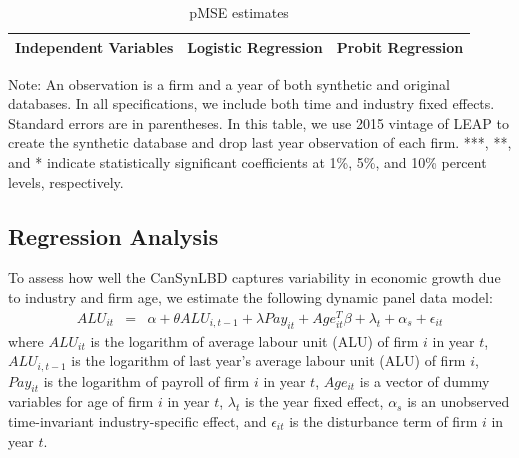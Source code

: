 \documentclass{article}
\begin{document}
\begin{table}[H]
  \centering
\begin{threeparttable}
 \caption{pMSE estimates} \label{pMSE_regression} \medskip
\renewcommand{\arraystretch}{1}
\begin{tabular}{l|c c| c c}
\toprule
\textbf{Independent Variables}&\multicolumn{2}{c|}{\textbf{Logistic Regression}} &  \multicolumn{2}{c}{\textbf{Probit Regression}}\\
\midrule

   \bottomrule
  \end{tabular} 
\begin{tablenotes}
\small
\item Note: An observation is a firm and a year of both synthetic and original databases. In all specifications, we include both time and industry fixed effects. Standard errors are in parentheses. In this table, we use 2015 vintage of LEAP to create the synthetic database and drop last year observation of each firm. ***, **, and * indicate statistically significant coefficients at 1\%, 5\%, and 10\% percent levels, respectively.
 \end{tablenotes}
 \end{threeparttable}
\end{table}

\subsection{Regression Analysis}

To assess how well the CanSynLBD captures variability in economic growth due to industry and firm age, we estimate the following dynamic panel data model:
\begin{eqnarray}	
ALU_{it} & = & \alpha + \theta ALU_{i,t-1} + \lambda Pay_{it} + Age_{it}^{T}\beta + \lambda_t + \alpha_s + \epsilon_{it}
\end{eqnarray}
where $ALU_{it}$ is the logarithm of average labour unit (ALU) of firm $i$ in year $t$, $ALU_{i,t-1}$ is the logarithm of last year's average labour unit (ALU) of firm $i$, $Pay_{it}$ is the logarithm of payroll of firm $i$ in year $t$, $Age_{it}$ is a vector of dummy variables for age of firm $i$ in year $t$, $\lambda_t$ is the year fixed effect, $\alpha_s$ is an unobserved time-invariant industry-specific effect, and $\epsilon_{it}$ is the disturbance term of firm $i$ in year $t$. 
\end{document}
